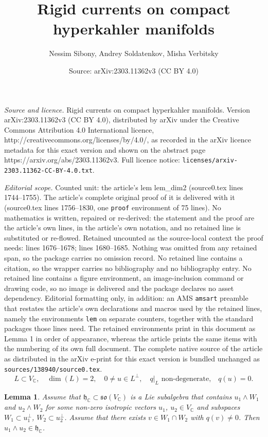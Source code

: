 \documentclass[10pt,a4paper]{amsart}
\title{Rigid currents on compact hyperkahler manifolds}
\author{Nessim Sibony, Andrey Soldatenkov, Misha Verbitsky}
\date{Source: arXiv:2303.11362v3 (CC BY 4.0)}
\newtheorem{lem}{Lemma}
\newcommand{\bbC}{\mathbb{C}}
\newcommand{\frh}{\mathfrak{h}}
\newcommand{\frso}{\mathfrak{so}}
\newcommand{\wdg}{\wedge}
\begin{document}
\maketitle

\noindent\emph{Source and licence.} Rigid currents on compact hyperkahler manifolds. Version arXiv:2303.11362v3 (CC BY 4.0), distributed by arXiv under the Creative Commons Attribution 4.0 International licence, http://creativecommons.org/licenses/by/4.0/, as recorded in the arXiv licence metadata for this exact version and shown on the abstract page https://arxiv.org/abs/2303.11362v3. Full licence notice: \texttt{licenses/arxiv-2303.11362-CC-BY-4.0.txt}.\par\smallskip

\noindent\textit{Editorial scope.} Counted unit: the article's lem lem\_dim2 (source0.tex lines 1744--1755). The article's complete original proof of it is delivered with it (source0.tex lines 1756--1830, one \texttt{proof} environment of 75 lines). No mathematics is written, repaired or re-derived: the statement and the proof are the article's own lines, in the article's own notation, and no retained line is substituted or re-flowed.  Retained uncounted as the source-local context the proof needs: lines 1676--1678; lines 1680--1685.  Nothing was omitted from any retained span, so the package carries no omission record.  No retained line contains a citation, so the wrapper carries no bibliography and no bibliography entry.  No retained line contains a figure environment, an image-inclusion command or drawing code, so no image is delivered and the package declares no asset dependency.  Editorial formatting only, in addition: an AMS \texttt{amsart} preamble that restates the article's own declarations and macros used by the retained lines, namely the environments \texttt{lem} on separate counters, together with the standard packages those lines need.  The retained environments print in this document as Lemma 1 in order of appearance, whereas the article prints the same items with the numbering of its own full document.  The complete native source of the article as distributed in the arXiv e-print for this exact version is bundled unchanged as \texttt{sources/138940/source0.tex}.
\begin{equation}\label{eqn_set2}
L\subset V_\bbC,\quad\!\! \dim(L) = 2,\quad\!\! 0\neq u\in L^\perp,\quad\!\! q|_L \mbox{ non-degenerate,} \quad\!\! q(u) = 0.
\end{equation}

\begin{lem}\label{lem_bracket}
Assume that $\frh_\bbC\subset\frso(V_\bbC)$ is a Lie subalgebra
that contains $u_1\wdg W_1$ and $u_2\wdg W_2$ for some non-zero isotropic vectors $u_1$, $u_2\in V_\bbC$
and subspaces $W_1\subset u_1^\perp$, $W_2\subset u_2^\perp$.
Assume that there exists $v\in W_1\cap W_2$ with $q(v) \neq 0$. Then $u_1\wdg u_2\in \frh_\bbC$.
\end{lem}
\end{document}
